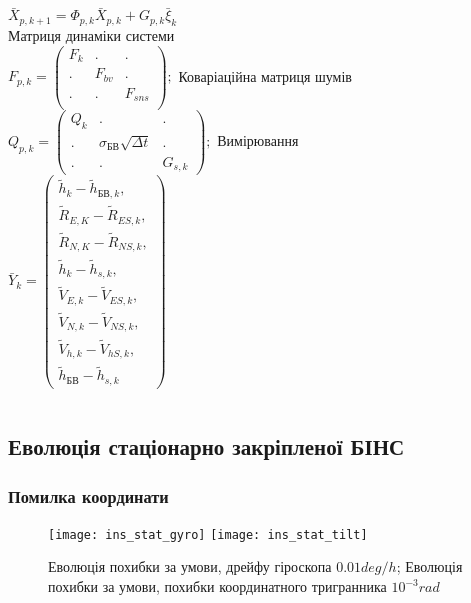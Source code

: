 \documentclass[ucs]{beamer}    %
\begin{document}
\begin{frame}[shrink=5]
\begin{columns}[t]
\begin{column}{5cm}
$\bar{X}_{p,k+1} =\Phi_{p,k} \bar{X}_{p,k} +G_{p,k} \bar{\xi }_{k}$ \\
Матриця динаміки системи\\
$ F_{p,k} =\left(\begin{array}{ccc} 
{F_{k} } & {.} & {.} \\
{.} & {F_{bv}} & {.} \\
{.} & {.} & {F_{sns}} \\
\end{array}\right);$
Коваріаційна матриця шумів\\
$Q_{p,k} =\left(\begin{array}{ccc} 
{Q_{k} } & {.} & {.} \\ 
{.} & {\sigma_{\text{БВ}} \sqrt{\Delta t}} & {.} \\ 
{.} & {.} & {G_{s,k} } \end{array}\right);$
Вимірювання\\
$\bar{Y}_{k} = 
\left(\begin{array}{l}
{\tilde{h}_{k} -\tilde{h}_{\text{БВ},k},}\\
{\tilde{R}_{E,K} -\tilde{R}_{ES,k},}\\
{\tilde{R}_{N,K} -\tilde{R}_{NS,k},}\\
{\tilde{h}_{k} -\tilde{h}_{s,k},}\\
{\tilde{V}_{E,k} -\tilde{V}_{ES,k},}\\
{\tilde{V}_{N,k} -\tilde{V}_{NS,k},}\\
{\tilde{V}_{h,k} -\tilde{V}_{hS,k},}\\
{\tilde{h}_{\text{БВ}} -\tilde{h}_{s,k}}
\end{array} \right) $
\end{column}
\end{columns}
\end{frame}

\subsection{Еволюція стаціонарно закріпленої БІНС} 
\begin{frame}[plain]
\frametitle{Помилка координати}

\begin{figure}[l]
\texttt{[image: ins\_stat\_gyro]}
\texttt{[image: ins\_stat\_tilt]}
\caption{\tiny Еволюція похибки за умови, дрейфу гіроскопа $0.01 deg/h$; Еволюція похибки за умови, похибки координатного тригранника $10^{-3} rad$}
\label{fig:sdins2}
\end{figure}
\end{frame}
\end{document}
